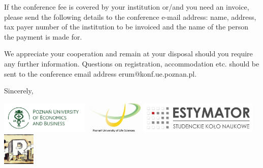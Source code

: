\documentclass[10pt,a4paper]{letter}\usepackage[]{graphicx}\usepackage[]{color}
\begin{document}
\begin{letter}
If the conference fee is covered by your institution or/and you need an invoice, please send the following details to the conference e-mail address: name, address, tax payer number of the institution to be invoiced and the name of the person the payment is made for.

We appreciate your cooperation and remain at your disposal should you require any further information. Questions on registration, accommodation etc. should be sent to the conference email address erum@konf.ue.poznan.pl. 

\closing{Sincerely,}
 
\begin{center}
\includegraphics[height=0.6in]{uep}
\includegraphics[height=0.6in]{up}
\includegraphics[height=0.6in]{logo-estym}
\includegraphics[height=0.6in]{logo-erum}
\end{center}
\end{letter}
\end{document}
